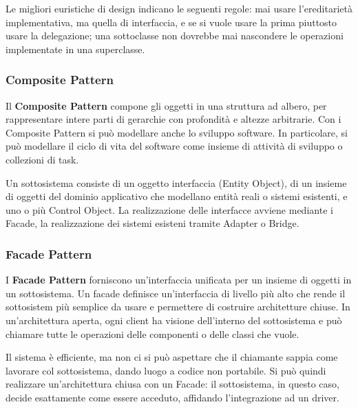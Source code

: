 \documentclass{article}
\begin{document}
        \vspace{3mm}
        
        Le migliori euristiche di design indicano le seguenti regole: mai usare l'ereditarietà implementativa, ma quella di interfaccia, e se si vuole usare la prima piuttosto usare la delegazione; una sottoclasse non dovrebbe mai nascondere le operazioni implementate in una superclasse.
        
        \subsubsection{Composite Pattern}
            
            Il \textbf{Composite Pattern} compone gli oggetti in una struttura ad albero, per rappresentare intere parti di gerarchie con profondità e altezze arbitrarie. Con i Composite Pattern si può modellare anche lo sviluppo software. In particolare, si può modellare il ciclo di vita del software come insieme di attività di sviluppo o collezioni di task.
            
            \vspace{6mm}
                    
            Un sottosistema consiste di un oggetto interfaccia (Entity Object), di un insieme di oggetti del dominio applicativo che modellano entità reali o sistemi esistenti, e uno o più Control Object. La realizzazione delle interfacce avviene mediante i Facade, la realizzazione dei sistemi esisteni tramite Adapter o Bridge.
                
        \subsubsection{Facade Pattern}
                
            I \textbf{Facade Pattern} forniscono un'interfaccia unificata per un insieme di oggetti in un sottosistema. Un facade definisce un'interfaccia di livello più alto che rende il sottosistem più semplice da usare e permettere di costruire architetture chiuse. In un'architettura aperta, ogni client ha visione dell'interno del sottosistema e può chiamare tutte le operazioni delle componenti o delle classi che vuole. 
            
            \vspace{3mm}
            
            Il sistema è efficiente, ma non ci si può aspettare che il chiamante sappia come lavorare col sottosistema, dando luogo a codice non portabile. Si può quindi realizzare un'architettura chiusa con un Facade: il sottosistema, in questo caso, decide esattamente come essere acceduto, affidando l'integrazione ad un driver.
              
\end{document}
